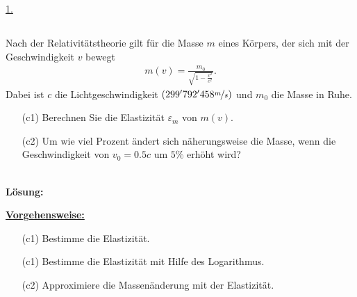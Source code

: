 \underline{1. }\\



\newpage
\subsection*{}
Nach der Relativitätstheorie gilt für die Masse $ m $ eines Körpers, der sich mit der Geschwindigkeit $ v $ bewegt
\begin{align*}
	m(v)
	=
	\frac{m_0}{\sqrt{1 - \frac{v^2}{c^2}}}.
\end{align*}
Dabei ist $ c $ die Lichtgeschwindigkeit $ (299'792'458 \nicefrac{m}{s}) $ und $ m_0 $ die Masse in Ruhe.
\begin{enumerate}
	\item[(c1)] Berechnen Sie die Elastizität $ \varepsilon_m $ von $ m(v) $.
	\item[(c2)] Um wie viel Prozent ändert sich näherungsweise die Masse, wenn die Geschwindigkeit von $ v_0 = 0.5c $ um $ 5 \% $ erhöht wird?
\end{enumerate}
\ \\
\textbf{Lösung:}
\begin{mdframed}
\underline{\textbf{Vorgehensweise:}}
\begin{enumerate}
\item[(c1)] Bestimme die Elastizität.
\item[(c1)] Bestimme die Elastizität mit Hilfe des Logarithmus.
\item[(c2)] Approximiere die Massenänderung mit der Elastizität.
\end{enumerate}
\end{mdframed}

